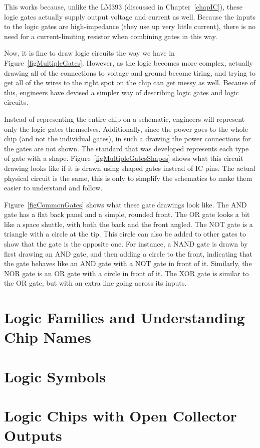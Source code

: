 This works because, unlike the LM393 (discussed in Chapter~\ref{chapIC}), these logic gates actually supply output voltage and current as well.  
Because the inputs to the logic gates are high-impedance (they use up very little current), there is no need for a current-limiting resistor when combining gates in this way.

Now, it is fine to draw logic circuits the way we have in Figure~\ref{figMultipleGates}.
However, as the logic becomes more complex, actually drawing all of the connections to voltage and ground become tiring, and trying to get all of the wires to the right spot on the chip can get messy as well.
Because of this, engineers have devised a simpler way of describing logic gates and logic circuits.


Instead of representing the entire chip on a schematic, engineers will represent only the logic gates themselves.
Additionally, since the power goes to the whole chip (and not the individual gates), in such a drawing the power connections for the gates are not shown.
The standard that was developed represents each type of gate with a shape.
Figure~\ref{figMultipleGatesShapes} shows what this circuit drawing looks like if it is drawn using shaped gates instead of IC pins.
The actual physical circuit is the same, this is only to simplify the schematics to make them easier to understand and follow.


Figure~\ref{figCommonGates} shows what these gate drawings look like.
The AND gate has a flat back panel and a simple, rounded front.
The OR gate looks a bit like a space shuttle, with both the back and the front angled.
The NOT gate is a triangle with a circle at the tip.
This circle can also be added to other gates to show that the gate is the opposite one.
For instance, a NAND gate is drawn by first drawing an AND gate, and then adding a circle to the front, indicating that the gate behaves like an AND gate with a NOT gate in front of it.
Similarly, the NOR gate is an OR gate with a circle in front of it.
The XOR gate is similar to the OR gate, but with an extra line going across its inputs.

\section{Logic Families and Understanding Chip Names}


\section{Logic Symbols}
\section{Logic Chips with Open Collector Outputs}

